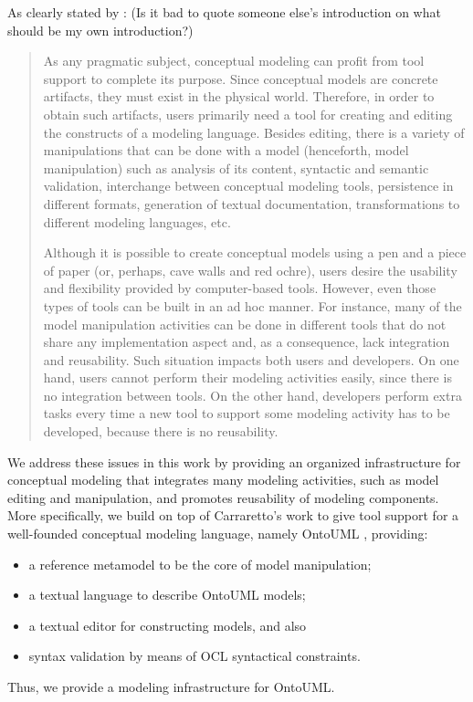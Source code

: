 \documentclass[
  10pt,				%
  oneside,
  a4paper,			%
  brazilian,
  english
]{abntex2}
\begin{document}
As clearly stated by \citeauthor{carraretto10}:
(Is it bad to quote someone else's introduction on what should be my own introduction?)
%
\begin{quotation}
As any pragmatic subject, conceptual modeling can profit from tool support to complete its purpose. Since conceptual models are concrete artifacts, they must exist in the physical world. Therefore, in order to obtain such artifacts, users primarily need a tool for creating and editing the constructs of a modeling language. Besides editing, there is a variety of manipulations that can be done with a model (henceforth, model manipulation) such as analysis of its content, syntactic and semantic validation, interchange between conceptual modeling tools, persistence in different formats, generation of textual documentation, transformations to different modeling languages, etc.

Although it is possible to create conceptual models using a pen and a piece of paper (or, perhaps, cave walls and red ochre), users desire the usability and flexibility provided by computer-based tools. However, even those types of tools can be built in an ad hoc manner. For instance, many of the model manipulation activities can be done in different tools that do not share any implementation aspect and, as a consequence, lack integration and reusability. Such situation impacts both users and developers. On one hand, users cannot perform their modeling activities easily, since there is no integration between tools. On the other hand, developers perform extra tasks every time a new tool to support some modeling activity has to be developed, because there is no reusability.
\end{quotation}

We address these issues in this work by providing an organized infrastructure for conceptual modeling that integrates many modeling activities, such as model editing and manipulation, and promotes reusability of modeling components.
%
More specifically, we
build on top of Carraretto's work \cite{carraretto10} to
give tool support for a well-founded conceptual modeling language, namely OntoUML \cite{guizzardi05}, providing:
\begin{itemize}[nolistsep]{\topsep=0em\partopsep=0em} \tightlist
  \item a reference metamodel to be the core of model manipulation;
  \item a textual language to describe OntoUML models;
  \item a textual editor for constructing models, and also
  \item syntax validation by means of OCL syntactical constraints.
\end{itemize}
%
Thus, we provide a modeling infrastructure for OntoUML.
\end{document}
